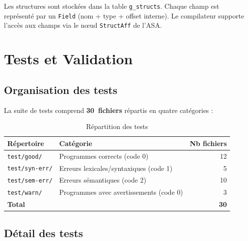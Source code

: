 \documentclass[12pt,a4paper]{article}
\begin{document}
Les structures sont stockées dans la table \texttt{g\_structs}. Chaque champ
est représenté par un \texttt{Field} (nom + type + offset interne). Le
compilateur supporte l'accès aux champs via le nœud \texttt{StructAff} de l'ASA.

\section{Tests et Validation}

\subsection{Organisation des tests}

La suite de tests comprend \textbf{30~fichiers} répartis en quatre catégories :

\begin{table}[H]
\centering
\begin{tabular}{llr}
\toprule
\textbf{Répertoire} & \textbf{Catégorie} & \textbf{Nb fichiers} \\
\midrule
\texttt{test/good/}    & Programmes corrects (code 0)      & 12 \\
\texttt{test/syn-err/} & Erreurs lexicales/syntaxiques (code 1) & 5 \\
\texttt{test/sem-err/} & Erreurs sémantiques (code 2)      & 10 \\
\texttt{test/warn/}    & Programmes avec avertissements (code 0) & 3 \\
\midrule
\textbf{Total}         &                                   & \textbf{30} \\
\bottomrule
\end{tabular}
\caption{Répartition des tests}
\end{table}

\subsection{Détail des tests}
\end{document}
